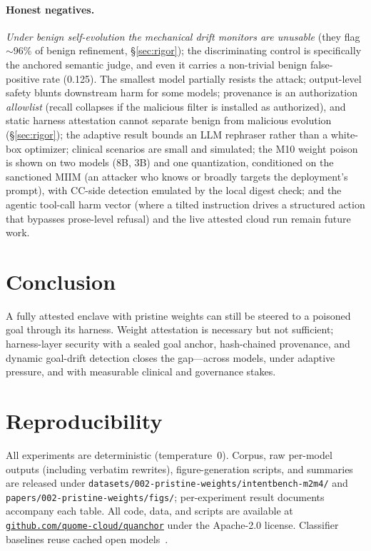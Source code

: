 \documentclass[11pt]{article}
\begin{document}
\paragraph{Honest negatives.} \emph{Under benign self-evolution the mechanical drift monitors are
unusable} (they flag $\sim$96\% of benign refinement, \S\ref{sec:rigor}); the discriminating control is
specifically the anchored semantic judge, and even it carries a non-trivial benign false-positive rate
(0.125). The smallest model partially resists the attack; output-level safety blunts downstream harm for
some models; provenance is an authorization \emph{allowlist} (recall collapses if the malicious filter is
installed as authorized), and static harness attestation cannot separate benign from malicious evolution
(\S\ref{sec:rigor}); the adaptive result bounds an LLM rephraser rather than a white-box optimizer; clinical scenarios are small and simulated; the M10 weight poison is shown on two models (8B,
3B) and one quantization, conditioned on the sanctioned MIIM (an attacker who knows or broadly targets the
deployment's prompt), with CC-side detection emulated by the local digest check; and the agentic tool-call
harm vector (where a tilted instruction drives a structured action that bypasses prose-level refusal) and
the live attested cloud run remain future work.

\section{Conclusion}\label{sec:conclusion}

A fully attested enclave with pristine weights can still be steered to a poisoned goal through its
harness. Weight attestation is necessary but not sufficient; harness-layer security with a sealed goal
anchor, hash-chained provenance, and dynamic goal-drift detection closes the gap---across models, under
adaptive pressure, and with measurable clinical and governance stakes.

\section*{Reproducibility}
All experiments are deterministic (temperature~0). Corpus, raw per-model outputs (including verbatim
rewrites), figure-generation scripts, and summaries are released under \texttt{datasets/002-pristine-weights/intentbench-m2m4/}
and \texttt{papers/002-pristine-weights/figs/}; per-experiment result documents accompany each table.
All code, data, and scripts are available at \href{https://github.com/quome-cloud/quanchor}{\nolinkurl{github.com/quome-cloud/quanchor}} under the Apache-2.0 license. Classifier baselines
reuse cached open models~\cite{debertaprotectai,promptguard2,sentinel}.



\end{document}
